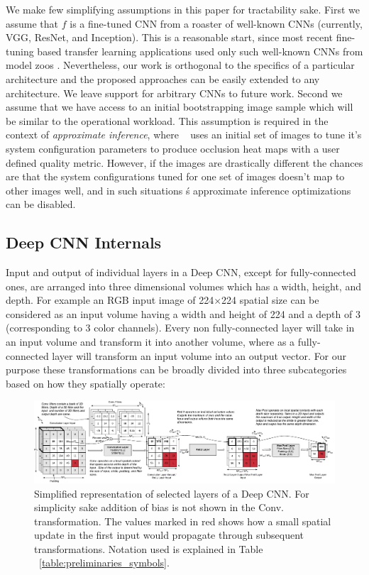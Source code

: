 We make few simplifying assumptions in this paper for tractability sake.
First we assume that $f$ is a fine-tuned CNN from a roaster of well-known CNNs (currently, VGG, ResNet, and Inception).
This is a reasonable start, since most recent fine-tuning based transfer learning applications used only such well-known CNNs from model zoos \cite{caffemodelzoo, tfmodelzoo}.
Nevertheless, our work is orthogonal to the specifics of a particular architecture and the proposed approaches can be easily extended to any architecture.
We leave support for arbitrary CNNs to future work.
Second we assume that we have access to an initial bootstrapping image sample which will be similar to the operational workload.
This assumption is required in the context of \textit{approximate inference}, where \system~ uses an initial set of images to tune it's system configuration parameters to produce occlusion heat maps with a user defined quality metric.
However, if the images are drastically different the chances are that the system configurations tuned for one set of images doesn't map to other images well, and in such situations \system\'s approximate inference optimizations can be disabled.

\subsection{Deep CNN Internals}
Input and output of individual layers in a Deep CNN, except for fully-connected ones, are arranged into three dimensional volumes which has a width, height, and depth.
For example an RGB input image of 224$\times$224 spatial size can be considered as an input volume having a width and height of 224 and a depth of 3 (corresponding to 3 color channels). Every non fully-connected layer will take in an input volume and transform it into another volume, where as a fully-connected layer will transform an input volume into an output vector. For our purpose these transformations can be broadly divided into three subcategories based on how they spatially operate:

\begin{figure}[t]
\includegraphics[width=\textwidth]{images/cnn_simplified}
\caption{Simplified representation of selected layers of a Deep CNN. For simplicity sake addition of bias is not shown in the Conv. transformation. The values marked in red shows how a small spatial update in the first input would propagate through subsequent transformations. Notation used is explained in Table ~\ref{table:preliminaries_symbols}.}
\end{figure}

